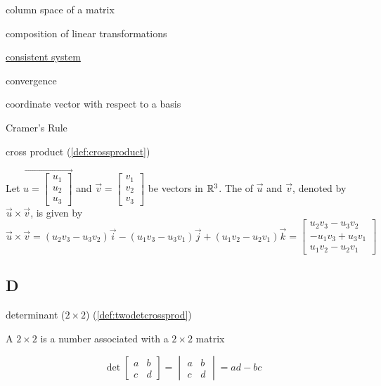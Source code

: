 \documentclass{ximera}
\begin{document}
column space of a matrix

composition of linear transformations

\href{https://ximera.osu.edu/oerlinalg/LinearAlgebra/SYS-0010/main}{consistent system}

convergence

coordinate vector with respect to a basis

Cramer's Rule

cross product (\ref{def:crossproduct})
\begin{expandable}
    Let $\vec{u=\begin{bmatrix}u_1\\u_2\\u_3\end{bmatrix}}$ and $\vec{v}=\begin{bmatrix}v_1\\v_2\\v_3\end{bmatrix}$ be vectors in $\mathbb{R}^3$.  The  of $\vec{u}$ and $\vec{v}$, denoted by $\vec{u}\times\vec{v}$, is given by
$$\vec{u}\times\vec{v}=(u_2v_3-u_3v_2)\vec{i}-(u_1v_3-u_3v_1)\vec{j}+(u_1v_2-u_2v_1)\vec{k}
=\begin{bmatrix}u_2v_3-u_3v_2\\-u_1v_3+u_3v_1\\u_1v_2-u_2v_1\end{bmatrix}$$
\end{expandable}

\subsection{D}
determinant ($2\times 2$) (\ref{def:twodetcrossprod})
\begin{expandable}
    A $2\times 2$  is a number associated with a $2\times 2$ matrix

$$\det{\begin{bmatrix}
a & b\\
c & d
\end{bmatrix}}=\begin{vmatrix}
a & b\\
c & d
\end{vmatrix} =ad-bc$$
\end{expandable}
\end{document}
